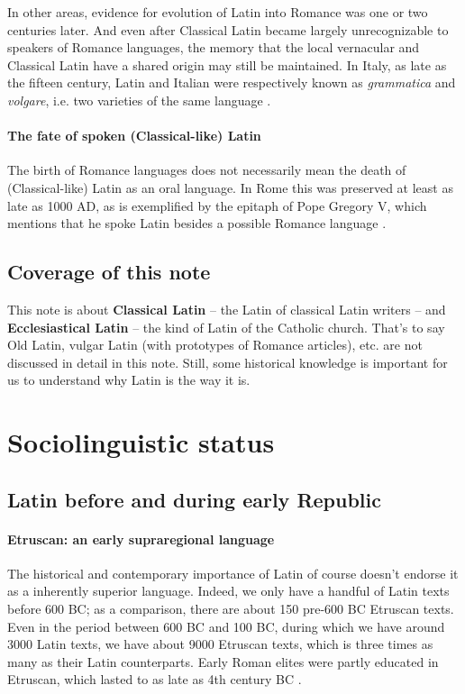 \documentclass[a4paper, oneside, 12pt]{report}
\newcommand*{\citepage}[1]{p.~{#1}}
\newcommand*{\concept}[1]{\textbf{#1}}
\newcommand{\form}[1]{\emph{#1}}
\begin{document}
In other areas, evidence for evolution of Latin into Romance was one or two centuries later.
And even after Classical Latin became largely unrecognizable
to speakers of Romance languages,
the memory that the local vernacular and Classical Latin have a shared origin
may still be maintained.
In Italy, as late as the fifteen century,
Latin and Italian were respectively known as \form{grammatica} and \form{volgare},
i.e. two varieties of the same language
\citep[\citepage{146}]{leonhardt2013latin}.

\paragraph*{The fate of spoken (Classical-like) Latin}
The birth of Romance languages does not necessarily mean 
the death of (Classical-like) Latin as an oral language.
In Rome this was preserved at least as late as 1000 AD,
as is exemplified by the epitaph of Pope Gregory V,
which mentions that he spoke Latin besides a possible Romance language 
\citep[\citepage{268}]{clackson2011blackwell}.

\subsection{Coverage of this note}

This note is about \concept{Classical Latin} -- the Latin of classical Latin writers -- 
and \concept{Ecclesiastical Latin} -- the kind of Latin of the Catholic church.
That's to say Old Latin, vulgar Latin (with prototypes of Romance articles), etc.
are not discussed in detail in this note.
Still, some historical knowledge is important for us to understand 
why Latin is the way it is. 

\section{Sociolinguistic status}

\subsection{Latin before and during early Republic}

\paragraph*{Etruscan: an early supraregional language}
The historical and contemporary importance of Latin 
of course doesn't endorse it as a inherently superior language. 
Indeed, we only have a handful of Latin texts before 600 BC; 
as a comparison, there are about 150 pre-600 BC Etruscan texts.
Even in the period between 600 BC and 100 BC, 
during which we have around 3000 Latin texts,
we have about 9000 Etruscan texts, 
which is three times as many as their Latin counterparts. 
Early Roman elites were partly educated in Etruscan,
which lasted to as late as 4th century BC \citep[\citepage{43}]{leonhardt2013latin}.
\end{document}
